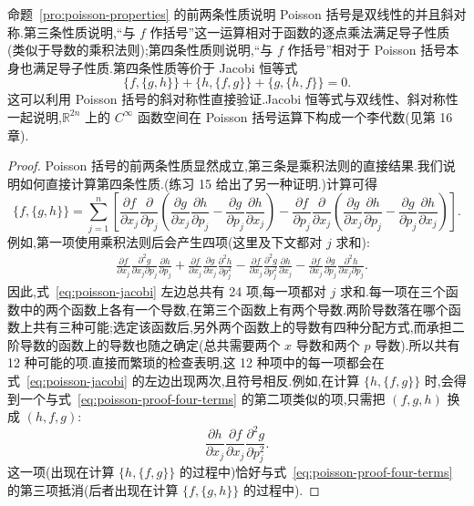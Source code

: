 命题~\ref{pro:poisson-properties} 的前两条性质说明 Poisson 括号是双线性的并且斜对称.第三条性质说明,“与 $f$ 作括号”这一运算相对于函数的逐点乘法满足导子性质(类似于导数的乘积法则);第四条性质则说明,“与 $f$ 作括号”相对于 Poisson 括号本身也满足导子性质.第四条性质等价于 Jacobi 恒等式
\begin{equation}
  \{f,\{g,h\}\}+\{h,\{f,g\}\}+\{g,\{h,f\}\}=0.
  \label{eq:poisson-jacobi}
\end{equation}
这可以利用 Poisson 括号的斜对称性直接验证.Jacobi 恒等式与双线性、斜对称性一起说明,$\mathbb{R}^{2n}$ 上的 $C^{\infty}$ 函数空间在 Poisson 括号运算下构成一个李代数(见第 16 章).

\begin{proof}
Poisson 括号的前两条性质显然成立,第三条是乘积法则的直接结果.我们说明如何直接计算第四条性质.(练习 15 给出了另一种证明.)计算可得
\[
\{f,\{g,h\}\}
=\sum_{j=1}^{n}\left[
\frac{\partial f}{\partial x_{j}}\frac{\partial}{\partial p_{j}}
  \left(\frac{\partial g}{\partial x_{j}}\frac{\partial h}{\partial p_{j}}-\frac{\partial g}{\partial p_{j}}\frac{\partial h}{\partial x_{j}}\right)
-\frac{\partial f}{\partial p_{j}}\frac{\partial}{\partial x_{j}}
  \left(\frac{\partial g}{\partial x_{j}}\frac{\partial h}{\partial p_{j}}-\frac{\partial g}{\partial p_{j}}\frac{\partial h}{\partial x_{j}}\right)
\right].
\]
例如,第一项使用乘积法则后会产生四项(这里及下文都对 $j$ 求和):
\begin{align}
&\frac{\partial f}{\partial x_{j}}\frac{\partial^{2}g}{\partial x_{j}\partial p_{j}}\frac{\partial h}{\partial p_{j}}
 +\frac{\partial f}{\partial x_{j}}\frac{\partial g}{\partial x_{j}}\frac{\partial^{2}h}{\partial p_{j}^{2}}
 -\frac{\partial f}{\partial x_{j}}\frac{\partial^{2}g}{\partial p_{j}^{2}}\frac{\partial h}{\partial x_{j}}
 -\frac{\partial f}{\partial x_{j}}\frac{\partial g}{\partial p_{j}}\frac{\partial^{2}h}{\partial x_{j}\partial p_{j}}.
\label{eq:poisson-proof-four-terms}
\end{align}
因此,式~\eqref{eq:poisson-jacobi} 左边总共有 24 项,每一项都对 $j$ 求和.每一项在三个函数中的两个函数上各有一个导数,在第三个函数上有两个导数.两阶导数落在哪个函数上共有三种可能;选定该函数后,另外两个函数上的导数有四种分配方式,而承担二阶导数的函数上的导数也随之确定(总共需要两个 $x$ 导数和两个 $p$ 导数).所以共有 12 种可能的项.直接而繁琐的检查表明,这 12 种项中的每一项都会在式~\eqref{eq:poisson-jacobi} 的左边出现两次,且符号相反.例如,在计算 $\{h,\{f,g\}\}$ 时,会得到一个与式~\eqref{eq:poisson-proof-four-terms} 的第二项类似的项,只需把 $(f,g,h)$ 换成 $(h,f,g)$:
\[
  \frac{\partial h}{\partial x_{j}}\frac{\partial f}{\partial x_{j}}\frac{\partial^{2}g}{\partial p_{j}^{2}}.
\]
这一项(出现在计算 $\{h,\{f,g\}\}$ 的过程中)恰好与式~\eqref{eq:poisson-proof-four-terms} 的第三项抵消(后者出现在计算 $\{f,\{g,h\}\}$ 的过程中).
\end{proof}

